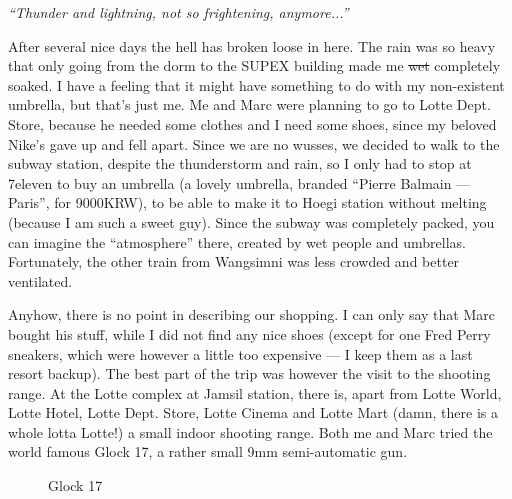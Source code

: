 \begin{post}
	\begin{content}
\textit{``Thunder and lightning, not so frightening, anymore...''}

After several nice days the hell has broken loose in here. The rain was so heavy that only going from the dorm to the SUPEX building made me \sout{wet} completely soaked. I have a feeling that it might have something to do with my non-existent umbrella, but that's just me. Me and Marc were planning to go to Lotte Dept. Store, because he needed some clothes and I need some shoes, since my beloved Nike's gave up and fell apart. Since we are no wusses, we decided to walk to the subway station, despite the thunderstorm and rain, so I only had to stop at 7eleven to buy an umbrella (a lovely umbrella, branded ``Pierre Balmain — Paris'', for 9000KRW), to be able to make it to Hoegi station without melting (because I am such a sweet guy). Since the subway was completely packed, you can imagine the ``atmosphere'' there, created by wet people and umbrellas. Fortunately, the other train from Wangsimni was less crowded and better ventilated.

Anyhow, there is no point in describing our shopping. I can only say that Marc bought his stuff, while I did not find any nice shoes (except for one Fred Perry sneakers, which were however a little too expensive — I keep them as a last resort backup). The best part of the trip was however the visit to the shooting range. At the Lotte complex at Jamsil station, there is, apart from Lotte World, Lotte Hotel, Lotte Dept. Store, Lotte Cinema and Lotte Mart (damn, there is a whole lotta Lotte!) a small indoor shooting range. Both me and Marc tried the world famous Glock 17, a rather small 9mm semi-automatic gun.

\begin{figure}[h]
\centering
{}
\caption{Glock 17}
\end{figure}


\end{content}
\end{post}
